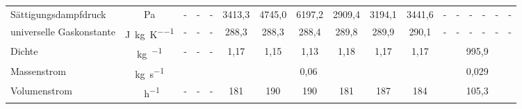 \begin{landscape}
\begin{table}[h!]
{\begin{tabular}{l|c|c|c|c|c|c|c|c|c|c|c|c|c|c|c|c}
					\hline
					Sättigungsdampfdruck & Pa    & -     & -     & -     & 3413,3 & 4745,0 & 6197,2 & 2909,4 & 3194,1 & 3441,6 & -     & -     & -     & -     & -     & - \\
					universelle Gaskonstante & \si{\joule \per \kg \per \kelvin} & -     & -     & -     & 288,3 & 288,3 & 288,4 & 289,8 & 289,9 & 290,1 & -     & -     & -     & -     & -     & - \\
					\hline
					Dichte & \si{\kg\per\kmeter} & -     & -     & -     & \multicolumn{1}{c|}{1,17} & \multicolumn{1}{c|}{1,15} & 1,13  & \multicolumn{1}{c|}{1,18} & \multicolumn{1}{c|}{1,17} & \multicolumn{1}{c|}{1,17} & \multicolumn{6}{c}{995,9} \\
					\hline
					Massenstrom & \si{\kg\per\second}  &     \multicolumn{9}{|c|}{0,06}    & \multicolumn{6}{c}{0,029} \\
					\hline
					Volumenstrom & \si{\kmeter \per \hour} & -     & -     & -     & 181   & 190   & 190   & 181   & 187   & 184   & \multicolumn{6}{c}{105,3} \\
				\end{tabular}
			}
		\end{table}%
		\FloatBarrier
	\end{landscape}


